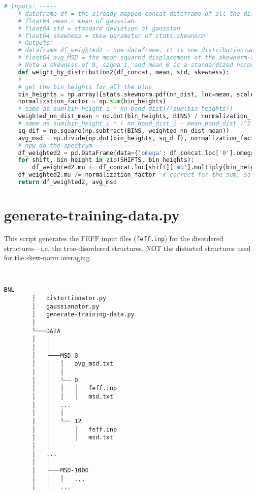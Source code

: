 \begin{lstlisting}[language=Python]
    # Inputs: -----
    # dataframe df = the already mapped concat dataframe of all the different delta_rho shifted feff xanes
    # float64 mean = mean of gaussian.
    # float64 std = standard deviation of gaussian
    # float64 skewness = skew parameter of stats.skewnorm
    # Outputs: ----
    # dataframe df_weighted2 = one dataframe. It is one distribution-weighted spectra with cols=['omega','mu']
    # float64 avg_MSD = the mean squared displacement of the skewnorm-averaged spectrum
    # Note a skewness of 0, sigma 1, and mean 0 is a standardized normal distribution.
    def weight_by_distribution2(df_concat, mean, std, skewness):
    # ---------
    # get the bin heights for all the bins
    bin_heights = np.array([stats.skewnorm.pdf(nn_dist, loc=mean, scale=std, a=skewness) for nn_dist in BINS])
    normalization_factor = np.sum(bin_heights)
    # same as sum(bin_height_i * nn_bond_dist)/(sum(bin_heights))
    weighted_nn_dist_mean = np.dot(bin_heights, BINS) / normalization_factor
    # same as sum(bin_height_i * ( nn_bond_dist_i - mean_bond_dist )^2 )/sum(bin_heights)
    sq_dif = np.square(np.subtract(BINS, weighted_nn_dist_mean))
    avg_msd = np.divide(np.dot(bin_heights, sq_dif), normalization_factor)
    # now do the spectrum -----------------
    df_weighted2 = pd.DataFrame(data={'omega': df_concat.loc['0'].omega, 'mu': np.zeros(df_concat.loc['0'].omega.shape[0])})
    for shift, bin_height in zip(SHIFTS, bin_heights):
        df_weighted2.mu += df_concat.loc[shift]['mu'].multiply(bin_height)
    df_weighted2.mu /= normalization_factor  # correct for the sum, so the area under the PDF=1
    return df_weighted2, avg_msd
\end{lstlisting}
    

\section{generate-training-data.py}
This script generates the FEFF input files (\texttt{feff.inp}) for the disordered structures---i.e. the true-disordered structures, NOT the distorted structures used for the skew-norm averaging.

\begin{minipage}{\linewidth}
    ~ \\
    \begin{Verbatim}[samepage=false]
        BNL
        │   distortionator.py
        │   gaussianator.py
        │   generate-training-data.py
        │       
        └───DATA
        │   │       
        │   │
        │   └───MSD-0
        │   │   │   avg_msd.txt
        │   │   │
        │   │   └── 0
        │   │   │   │   feff.inp
        │   │   │   │   msd.txt
        │   │   ...
        │   │   │
        │   │   └── 12
        │   │       │   feff.inp
        │   │       │   msd.txt
        │   │       
        │   ...
        │   │
        │   └───MSD-1000
        │   │   │   ...
        │   │   ...

    \end{Verbatim}
    ~
    \end{minipage}

